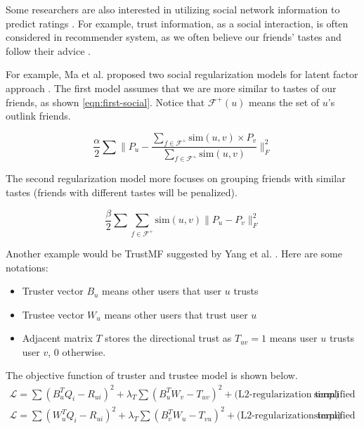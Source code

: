 \documentclass[letter paper, 11pt]{article}
\begin{document}
	Some researchers are also interested in utilizing social network information to predict ratings \cite{social-regularization} \cite{review}. For example, trust information, as a social interaction, is often considered in recommender system, as we often believe our friends' tastes and follow their advice \cite{social-regularization}.
	
	For example, Ma et al. proposed two social regularization models for latent factor approach \cite{social-regularization}. The first model assumes that we are more similar to tastes of our friends, as shown \ref{eqn:first-social}. Notice that $\mathcal{F}^+(u)$ means the set of $u$'s outlink friends.
	
	\begin{equation}
		\label{eqn:first-social}
		\tag*{First Regularization Term}
		\dfrac{\alpha}{2} \sum \|P_u - \dfrac{\sum_{f \in \mathcal{F}^+} \text{sim}(u, v) \times P_v }{\sum_{f \in \mathcal{F}^+} \text{sim}(u, v)} \|_F^2
	\end{equation} 
	
	The second regularization model more focuses on grouping friends with similar tastes (friends with different tastes will be penalized).

	\begin{equation}
		\label{eqn:sec-social}
		\tag*{Second Regularization Model}
		\dfrac{\beta}{2} \sum \sum_{f \in \mathcal{F}^+} \text{sim}(u, v) \|P_u - P_v\|_F^2
	\end{equation}
	
	Another example would be TrustMF suggested by Yang et al. \cite{TrustMF}. Here are some notations:
	\begin{itemize}
		\item Truster vector $B_u$ means other users that user $u$ trusts
		
		\item Trustee vector $W_u$ means other users that trust user $u$
		
		\item Adjacent matrix $T$ stores the directional trust as $T_{uv} = 1$ means user $u$ trusts user $v$, 0 otherwise.
	\end{itemize}
	
	The objective function of truster and trustee model is shown below.
	\begin{equation}
		\begin{split}
			\mathcal{L} = \sum (B_u^T Q_i - R_{ui})^2 + \lambda_T \sum (B_u^T W_v - T_{uv})^2 + \text{(L2-regularization term)} & \quad \text{simplified truster model} \\
			\mathcal{L} = \sum (W_u^T Q_i - R_{ui})^2 + \lambda_T \sum (B_v^T W_u - T_{vu})^2 + \text{(L2-regularization term)} & \quad \text{simplified trustee model} 
		\end{split}		
	\end{equation}
\end{document}
